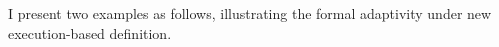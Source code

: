 I present two examples as follows, illustrating the formal adaptivity under new execution-based
definition.


